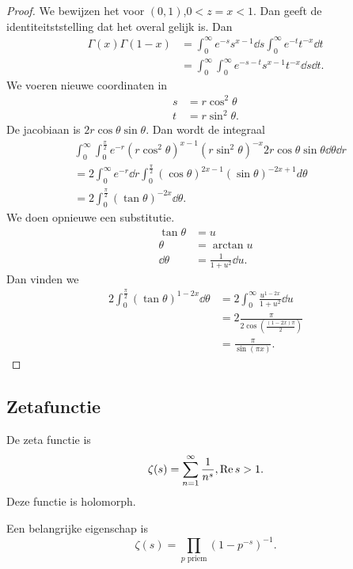 \begin{proof}
	We bewijzen het voor $(0, 1)$,$0< z = x < 1$. Dan geeft de identiteitststelling dat het overal gelijk is.
	Dan 
	\begin{align*}
		\Gamma(x) \Gamma(1 - x) &= \int_{0}^{\infty} e^{-s} s^{x  - 1} \dd s \int_{0}^{\infty} e^{-t} t ^{-x} \dd t  \\
		&= \int_{0}^{\infty} \int_{0}^{\infty} e^{-s-t}s^{x-1}t ^{-x}\dd s \dd t   
	.\end{align*}
	We voeren nieuwe coordinaten in 
	\begin{align*}
		s &= r \cos^2 \theta\\
		t &= r \sin^2 \theta
	.\end{align*}
	De jacobiaan is $2r \cos \theta \sin \theta$. 
	Dan wordt de integraal 
	\begin{align*}
		&\int_{0}^{\infty} \int_{0}^{\frac{\pi}{2}} e^{-r}(r\cos^2\theta)^{x-1}(r \sin^2\theta)^{-x}2r \cos \theta \sin \theta \dd \theta \dd r \\
		&= 2 \int_{0}^{\infty} e^{-r}\dd r \int_{0}^{\frac{\pi}{2}} (\cos \theta)^{2x -1}(\sin \theta)^{-2x+1} d \theta   \\
		&= 2 \int_{0}^{\frac{\pi}{2}} (\tan \theta)^{-2x} \dd \theta  
	.\end{align*}
	We doen opnieuwe een substitutie.
	\begin{align*}
		\tan \theta &= u \\
		\theta &=  \arctan u  \\
		\dd \theta &= \frac{1}{1 + u^2} \dd u
	.\end{align*}
	Dan vinden we 
	\begin{align*}
		2 \int_{0}^{\frac{\pi}{2}} (\tan \theta)^{1-2x} \dd \theta &= 2 \int_{0}^{\infty} \frac{u^{1 - 2x}}{1 + u^2} \dd u \\
									   &= 2 \frac{\pi}{2 \cos\left( \frac{(1 - 2x)\pi}{2} \right) } \\
									   &= \frac{\pi}{\sin(\pi x)} 
	.\end{align*}
\end{proof}
\subsection{Zetafunctie} \label{sec:zetafunctie}
\begin{definitie}
	De zeta functie is \[
		\zeta (s) = \sum_{n=1}^{\infty} \frac{1}{n^{s}}, \operatorname{Re} s > 1
	.\] 
	Deze functie is holomorph.
\end{definitie}
Een belangrijke eigenschap is
\[
	\zeta(s) = \prod_{p \text{ priem}}^{} (1 - p^{-s})^{-1} 
.\] 

